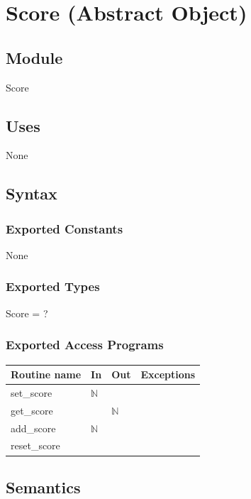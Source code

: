 \documentclass[12pt]{article}
\begin{document}
\newpage

\section* {Score (Abstract Object)}

\subsection*{Module}

Score

\subsection* {Uses}

None

\subsection* {Syntax}

\subsubsection* {Exported Constants}

None

\subsubsection* {Exported Types}

Score = ?

\subsubsection* {Exported Access Programs}

\begin{tabular}{| l | l | l | p{5cm} |}
  \hline
  \textbf{Routine name} & \textbf{In} & \textbf{Out} & \textbf{Exceptions}\\
  \hline
  set\_score & $\mathbb{N}$ & & & \\
  \hline
  get\_score & & $\mathbb{N}$ & \\
  \hline
  add\_score & $\mathbb{N}$ & & \\
  \hline
  reset\_score & & & \\
  \hline
  
\end{tabular}

\subsection* {Semantics}
\end{document}
